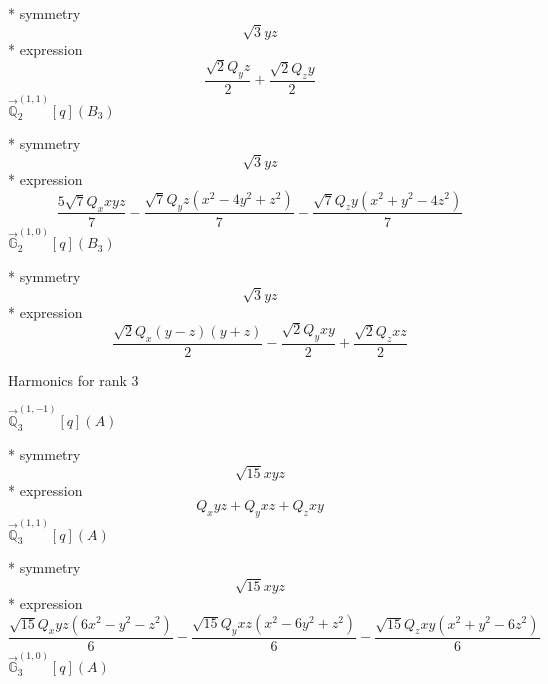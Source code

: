 \documentclass[fleqn,8pt]{jsarticle}
\begin{document}
\noindent\quad ** symmetry
\begin{dmath*}
\sqrt{3} y z
\end{dmath*}
\noindent\quad ** expression
\begin{dmath*}
\frac{\sqrt{2} Q_{y} z}{2} + \frac{\sqrt{2} Q_{z} y}{2}
\end{dmath*}
\noindent\quad $\vec{\mathbb{Q}}_{2}^{(1,1)}[q](B_{3})$

\noindent\quad ** symmetry
\begin{dmath*}
\sqrt{3} y z
\end{dmath*}
\noindent\quad ** expression
\begin{dmath*}
\frac{5 \sqrt{7} Q_{x} x y z}{7} - \frac{\sqrt{7} Q_{y} z \left(x^{2} - 4 y^{2} + z^{2}\right)}{7} - \frac{\sqrt{7} Q_{z} y \left(x^{2} + y^{2} - 4 z^{2}\right)}{7}
\end{dmath*}
\noindent\quad $\vec{\mathbb{G}}_{2}^{(1,0)}[q](B_{3})$

\noindent\quad ** symmetry
\begin{dmath*}
\sqrt{3} y z
\end{dmath*}
\noindent\quad ** expression
\begin{dmath*}
\frac{\sqrt{2} Q_{x} \left(y - z\right) \left(y + z\right)}{2} - \frac{\sqrt{2} Q_{y} x y}{2} + \frac{\sqrt{2} Q_{z} x z}{2}
\end{dmath*}

\noindent * Harmonics for rank 3

\noindent\quad $\vec{\mathbb{Q}}_{3}^{(1,-1)}[q](A)$

\noindent\quad ** symmetry
\begin{dmath*}
\sqrt{15} x y z
\end{dmath*}
\noindent\quad ** expression
\begin{dmath*}
Q_{x} y z + Q_{y} x z + Q_{z} x y
\end{dmath*}
\noindent\quad $\vec{\mathbb{Q}}_{3}^{(1,1)}[q](A)$

\noindent\quad ** symmetry
\begin{dmath*}
\sqrt{15} x y z
\end{dmath*}
\noindent\quad ** expression
\begin{dmath*}
\frac{\sqrt{15} Q_{x} y z \left(6 x^{2} - y^{2} - z^{2}\right)}{6} - \frac{\sqrt{15} Q_{y} x z \left(x^{2} - 6 y^{2} + z^{2}\right)}{6} - \frac{\sqrt{15} Q_{z} x y \left(x^{2} + y^{2} - 6 z^{2}\right)}{6}
\end{dmath*}
\noindent\quad $\vec{\mathbb{G}}_{3}^{(1,0)}[q](A)$
\end{document}
